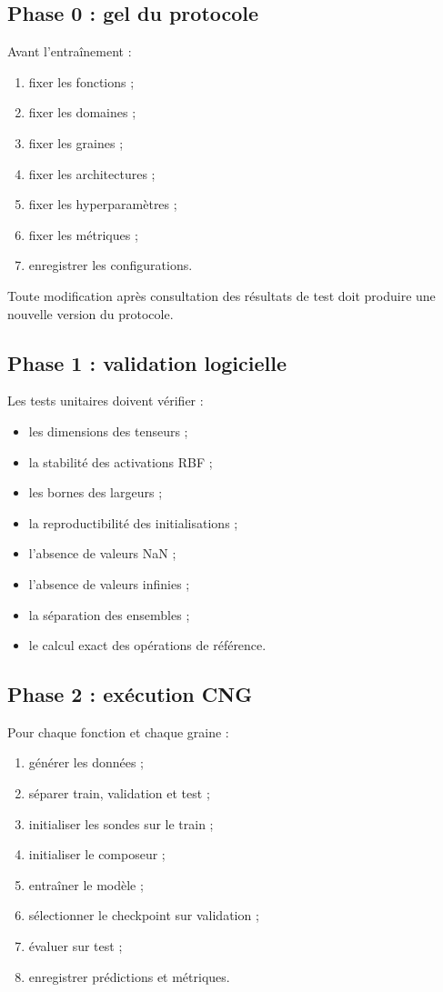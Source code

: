 \documentclass[11pt,a4paper]{article}
\begin{document}
\subsection{Phase 0 : gel du protocole}

Avant l'entraînement :
\begin{enumerate}
    \item fixer les fonctions ;
    \item fixer les domaines ;
    \item fixer les graines ;
    \item fixer les architectures ;
    \item fixer les hyperparamètres ;
    \item fixer les métriques ;
    \item enregistrer les configurations.
\end{enumerate}

Toute modification après consultation des résultats
de test doit produire une nouvelle version du protocole.

\subsection{Phase 1 : validation logicielle}

Les tests unitaires doivent vérifier :

\begin{itemize}
    \item les dimensions des tenseurs ;
    \item la stabilité des activations RBF ;
    \item les bornes des largeurs ;
    \item la reproductibilité des initialisations ;
    \item l'absence de valeurs NaN ;
    \item l'absence de valeurs infinies ;
    \item la séparation des ensembles ;
    \item le calcul exact des opérations de référence.
\end{itemize}

\subsection{Phase 2 : exécution CNG}

Pour chaque fonction et chaque graine :

\begin{enumerate}
    \item générer les données ;
    \item séparer train, validation et test ;
    \item initialiser les sondes sur le train ;
    \item initialiser le composeur ;
    \item entraîner le modèle ;
    \item sélectionner le checkpoint sur validation ;
    \item évaluer sur test ;
    \item enregistrer prédictions et métriques.
\end{enumerate}
\end{document}
